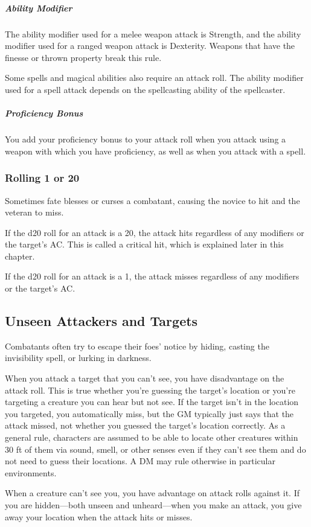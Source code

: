 \subparagraph*{Ability Modifier} The ability modifier used for a melee weapon attack is Strength, and the ability modifier used for a ranged weapon attack is Dexterity. Weapons that have the finesse or thrown property break this rule.

Some spells and magical abilities also require an attack roll. The ability modifier used for a spell attack depends on the spellcasting ability of the spellcaster.

\subparagraph*{Proficiency Bonus} You add your proficiency bonus to your attack roll when you attack using a weapon with which you have proficiency, as well as when you attack with a spell.

\subsubsection{Rolling 1 or 20}

Sometimes fate blesses or curses a combatant, causing the novice to hit and the veteran to miss.

If the d20 roll for an attack is a 20, the attack hits regardless of any modifiers or the target's AC. This is called a critical hit, which is explained later in this chapter.

If the d20 roll for an attack is a 1, the attack misses regardless of any modifiers or the target's AC.

\subsection{Unseen Attackers and Targets}\label{subsec:unseen-attackers}

Combatants often try to escape their foes' notice by hiding, casting the invisibility spell, or lurking in darkness.

When you attack a target that you can't see, you have disadvantage on the attack roll. This is true whether you're guessing the target's location or you're targeting a creature you can hear but not see. If the target isn't in the location you targeted, you automatically miss, but the GM typically just says that the attack missed, not whether you guessed the target's location correctly. As a general rule, characters are assumed to be able to locate other creatures within 30 ft of them via sound, smell, or other senses even if they can't see them and do not need to guess their locations. A DM may rule otherwise in particular environments.

When a creature can't see you, you have advantage on attack rolls against it. If you are hidden—both unseen and unheard—when you make an attack, you give away your location when the attack hits or misses.

